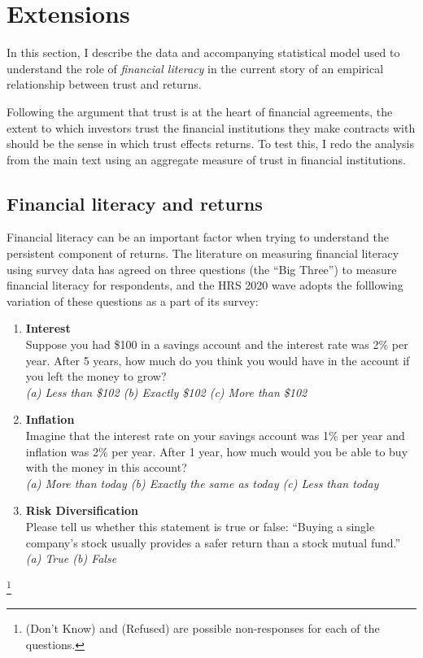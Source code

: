 \onlyinsubfile{\setcounter{section}{4}}
\section{Extensions}\notinsubfile{\label{sec:exts}}

\par In this section, I describe the data and accompanying statistical model used to understand the role of \textit{financial literacy} in the current story of an empirical relationship between trust and returns.

\par Following the argument that trust is at the heart of financial agreements, the extent to which investors trust the financial institutions they make contracts with should be the sense in which trust effects returns. To test this, I redo the analysis from the main text using an aggregate measure of trust in financial institutions. 

\subsection{Financial literacy and returns}

\par Financial literacy can be an important factor when trying to understand the persistent component of returns. The literature on measuring financial literacy using survey data has agreed on three questions (the ``Big Three'') to measure financial literacy for respondents, and the HRS 2020 wave adopts the folllowing variation of these questions as a part of its survey:

\begin{enumerate}
    \item \textbf{Interest} \\
    Suppose you had \$100 in a savings account and the interest rate was 2\% per year. After 5 years, how much do you think you would have in the account if you left the money to grow? \\
    \textit{(a) Less than \$102 \quad (b) Exactly \$102 \quad (c) More than \$102}
    
    \item \textbf{Inflation} \\
    Imagine that the interest rate on your savings account was 1\% per year and inflation was 2\% per year. After 1 year, how much would you be able to buy with the money in this account? \\
    \textit{(a) More than today \quad (b) Exactly the same as today \quad (c) Less than today}
    
    \item \textbf{Risk Diversification} \\
    Please tell us whether this statement is true or false: ``Buying a single company's stock usually provides a safer return than a stock mutual fund.'' \\
    \textit{(a) True \quad (b) False}
  \end{enumerate}\footnote{ (Don't Know) and  (Refused) are possible non-responses for each of the questions.}

